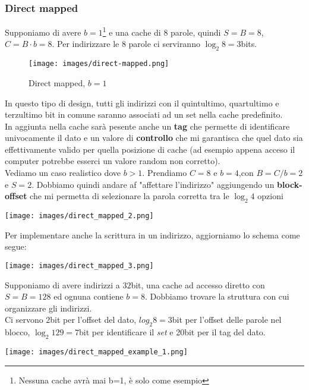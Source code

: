 \subsubsection{Direct mapped}
Supponiamo di avere $b=1$\footnote{Nessuna cache avrà mai b=1, è solo come esempio} e una cache di 8 parole, quindi $S=B=8$, $C=B\cdot b=8$. Per indirizzare le 8 parole ci serviranno $\log_2 8 = 3$bits.\\

\begin{wrapfigure}{r}{6.5cm}
	\centering
	\texttt{[image: images/direct-mapped.png]}
	\caption{Direct mapped, $b=1$}
\end{wrapfigure}

In questo tipo di design, tutti gli indirizzi con il quintultimo, quartultimo e terzultimo bit in comune saranno associati ad un set nella cache predefinito. \\
In aggiunta nella cache sarà pesente anche un \textbf{tag} che permette di identificare univocamente il dato e un valore di \textbf{controllo} che mi garantisca che quel dato sia effettivamente valido per quella posizione di cache (ad esempio appena acceso il computer potrebbe esserci un valore random non corretto).\\

\noindent Vediamo un caso realistico dove \(b > 1\). Prendiamo $C = 8$ e $b = 4$,con $B = C/b = 2$ e $S = 2$. Dobbiamo quindi andare af "affettare l'indirizzo" aggiungendo un \textbf{block-offset} che mi permetta di selezionare la parola corretta tra le $\log_2 4$ opzioni
\begin{center}
	\texttt{[image: images/direct\_mapped\_2.png]}
\end{center}

\noindent Per implementare anche la scrittura in un indirizzo, aggiorniamo lo schema come segue:
\begin{center}
	\texttt{[image: images/direct\_mapped\_3.png]}
\end{center}

\begin{example}
	\label{example:direct_access_1}
	Supponiamo di avere indirizzi a $32$bit, una cache ad accesso diretto con $S = B = 128$ ed ognuna contiene $b = 8$. Dobbiamo trovare la struttura con cui organizzare gli indirizzi.\\
	Ci servono $2$bit per l'offset del dato, $log_2 8=3$bit per l'offset delle parole nel blocco, \(\log_2 129 = 7\)bit per identificare il \emph{set} e 20bit per il tag del dato.
	\begin{center}
		\texttt{[image: images/direct\_mapped\_example\_1.png]}
	\end{center}
\end{example}

